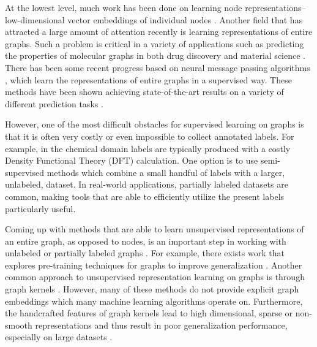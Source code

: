 \documentclass{article} \usepackage{iclr2020_conference,times}
\begin{document}
At the lowest level, much work has been done on learning node representations-- low-dimensional vector embeddings of individual nodes \cite{perozzi2014deepwalk,tang2015line, node2vec}. 
Another field that has attracted a large amount of attention recently is learning representations of entire graphs. Such a problem is critical in a variety of applications such as predicting the properties of molecular graphs in both drug discovery and material science \cite{chen2019utilizing,chen2019graph}.
There has been some recent progress based on neural message passing algorithms \cite{gilmer2017neural,xie2018crystal}, which learn the representations of entire graphs in a supervised way. These methods have been shown achieving state-of-the-art results on a variety of different prediction tasks \cite{kipf2018neural,xie2018crystal,gilmer2017neural,chen2019graph}.








However, one of the most difficult obstacles for supervised learning on graphs is that it is often very costly or even impossible to collect annotated labels. For example, in the chemical domain labels are typically produced with a costly Density Functional Theory (DFT) calculation. One option is to use semi-supervised methods which combine a small handful of labels with a larger, unlabeled, dataset. In real-world applications, partially labeled datasets are common, making tools that are able to efficiently utilize the present labels particularly useful. 

Coming up with methods that are able to learn unsupervised representations of an entire graph, as opposed to nodes, is an important step in working with unlabeled or partially labeled graphs \cite{narayanan2017graph2vec,hu2019pre,nguyen2017semi}. For example, there exists work that explores pre-training techniques for graphs to improve generalization \cite{hu2019pre}. Another common approach to unsupervised representation learning on graphs is through graph kernels \cite{prvzulj2007biological,kashima2003marginalized,orsini2015graph}. However, many of these methods do not provide explicit graph embeddings which many machine learning algorithms operate on. Furthermore, the handcrafted features of graph kernels lead to high dimensional, sparse or non-smooth representations and thus result in poor generalization performance, especially on large datasets \cite{narayanan2017graph2vec}.
\end{document}
